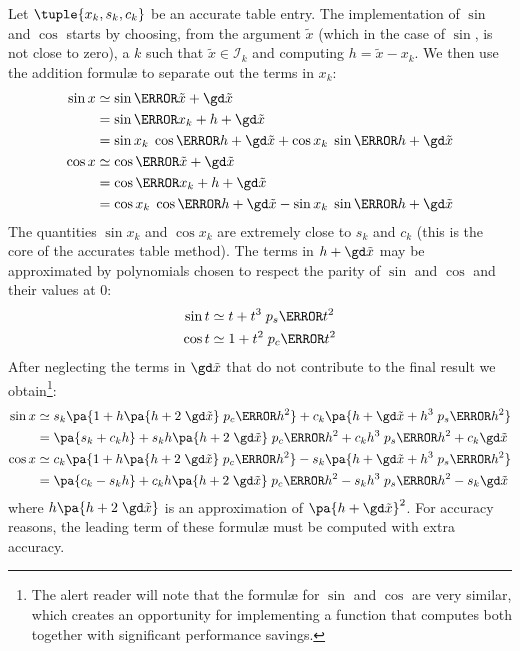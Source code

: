 \documentclass[10pt, a4paper, twoside]{basestyle}
\newcommand{\red}[1]{\tilde{#1}}
\begin{document}
Let $\tuple{x_k, s_k, c_k}$ be an accurate table entry.  The implementation of $\sin$ and $\cos$ starts by choosing, from the argument $\red x$ (which in the case of $\sin$, is not close to zero), a $k$ such that $\red x \in \mathscr{I}_k$ and computing $h = \red x - x_k$.  We then use the addition formulæ to separate out the terms in $x_k$:
\begin{align*}
\sin x &\simeq \sin\of{\red x + \gd \red x} \\
&= \sin\of{x_k + h + \gd \red x} \\
&= \sin x_k \; \cos\of{h + \gd \red x} + \cos x_k \; \sin\of{h + \gd \red x} \\
\cos x &\simeq \cos\of{\red x + \gd \red x}  \\
&= \cos\of{x_k + h + \gd \red x} \\
&= \cos x_k \; \cos\of{h + \gd \red x} - \sin x_k \; \sin\of{h + \gd \red x}
\end{align*}
The quantities $\sin x_k$ and $\cos x_k$ are extremely close to $s_k$ and $c_k$ (this is the core of the accurates table method).  The terms in $h + \gd \red x$ may be approximated by polynomials chosen to respect the parity of $\sin$ and $\cos$ and their values at $0$:
\begin{align*}
\sin t &\simeq t + t^3 \; p_s\of{t^2} \\
\cos t &\simeq 1 + t^2 \; p_c\of{t^2}
\end{align*}
After neglecting the terms in $\gd \red x$ that do not contribute to the final result we obtain\footnote{The alert reader will note that the formulæ for $\sin$ and $\cos$ are very similar, which creates an opportunity for implementing a function that computes both together with significant performance savings.}:
\begin{align*}
\sin x &\simeq s_k \pa{1 + h \pa{h + 2 \; \gd \red x} \; p_c\of{h^2}} + c_k \pa{h + \gd \red x + h^3 \; p_s\of{h^2}} \\
&= \pa{s_k + c_k h} + s_k h \pa{h + 2 \; \gd \red x} \; p_c\of{h^2} + c_k h^3 \; p_s\of{h^2} + c_k \gd \red x \\
\cos x &\simeq c_k \pa{1 + h \pa{h + 2 \; \gd \red x} \; p_c\of{h^2}} - s_k \pa{h + \gd \red x + h^3 \; p_s\of{h^2}} \\
&= \pa{c_k - s_k h} + c_k h \pa{h + 2 \; \gd \red x} \; p_c\of{h^2} - s_k h^3 \; p_s\of{h^2} - s_k \gd \red x
\end{align*}
where $h \pa{h + 2 \; \gd \red x}$ is an approximation of $\pa{h + \gd \red x}^2$.  For accuracy reasons, the leading term of these formulæ must be computed with extra accuracy.
\end{document}
